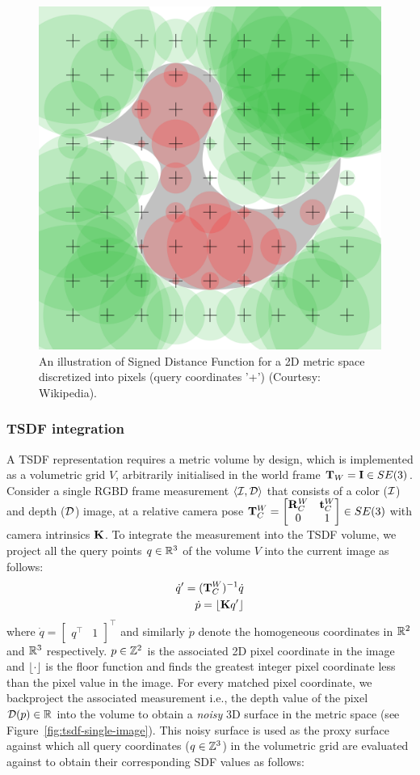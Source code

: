 \begin{figure}[htpb]
    \centering
    \includegraphics[width=0.5\linewidth]{figs/2d-sdf.png}
    \caption{An illustration of Signed Distance Function for a 2D metric space discretized into pixels (query coordinates '+') (Courtesy: Wikipedia).}%
    \label{fig:2d-sdf}
\end{figure}

\subsubsection{TSDF integration}

A TSDF representation requires a metric volume by design, which is implemented as a volumetric grid $V$, arbitrarily initialised in the world frame $\mathbf{T}_W = \mathbf{I} \in SE(3)$. Consider a single RGBD frame measurement $\langle \mathcal{I}, \mathcal{D} \rangle$ that consists of a color ($\mathcal{I}$) and depth ($\mathcal{D}$) image, at a relative camera pose $\mathbf{T}_C^W  = \begin{bmatrix}
    \mathbf{R}_C^W & \mathbf{t}_C^W \\ 0 & 1
\end{bmatrix}\in SE(3)$ with camera intrinsics $\mathbf{K}$. To integrate the measurement into the TSDF volume, we project  all the query points $q \in \mathbb{R}^3$ of the volume $V$ into the current image as follows:
\begin{align}
    \dot{q}^\prime = (\mathbf{T}_C^W)^{-1} \dot{q} \\
    \dot{p} = \lfloor \mathbf{K} q^\prime\rfloor
\end{align}
where $\dot{q} = \begin{bmatrix}
    q^\top & 1
\end{bmatrix}^\top$  and similarly $\dot{p}$ denote the homogeneous coordinates in $\mathbb{R}^2$ and $\mathbb{R}^3$ respectively. $p \in \mathbb{Z}^2$ is the associated 2D pixel coordinate in the image and $\lfloor \cdot \rfloor$ is the floor function and finds the greatest integer pixel coordinate less than the pixel value in the image. For every matched pixel coordinate, we backproject the associated measurement i.e., the depth value of the pixel $\mathcal{D}(p) \in \mathbb{R}$ into the volume to obtain a \emph{noisy} 3D surface in the metric space (see Figure~\ref{fig:tsdf-single-image}). This noisy surface is used as the proxy surface against which all query coordinates ($q \in \mathbb{Z}^3$) in the volumetric grid are evaluated against to obtain their corresponding SDF values as follows:

